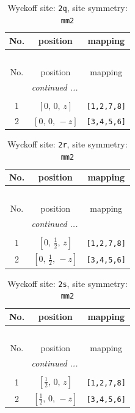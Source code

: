 \documentclass[fleqn,8pt]{jsarticle}
\begin{document}
\renewcommand{\arraystretch}{1.2}
\begin{longtable}{ccc}
\caption{Wyckoff site: {\tt 2q}, site symmetry: {\tt mm2}}
 \\
 \hline \hline
No. & position & mapping \\ \hline \endfirsthead

\multicolumn{2}{l}{\tablename\ \thetable{}} \\
 \hline \hline
No. & position & mapping \\ \hline \endhead

 \hline \hline
\multicolumn{2}{r}{\footnotesize\it continued ...} \\ \endfoot

 \hline \hline
\multicolumn{2}{r}{} \\ \endlastfoot

1 & $\left[ 0,\, 0,\, z \right]$ & {\tt [1,2,7,8]} \\ \hline
2 & $\left[ 0,\, 0,\, - z \right]$ & {\tt [3,4,5,6]} \\
\end{longtable}
\renewcommand{\arraystretch}{1.2}
\begin{longtable}{ccc}
\caption{Wyckoff site: {\tt 2r}, site symmetry: {\tt mm2}}
 \\
 \hline \hline
No. & position & mapping \\ \hline \endfirsthead

\multicolumn{2}{l}{\tablename\ \thetable{}} \\
 \hline \hline
No. & position & mapping \\ \hline \endhead

 \hline \hline
\multicolumn{2}{r}{\footnotesize\it continued ...} \\ \endfoot

 \hline \hline
\multicolumn{2}{r}{} \\ \endlastfoot

1 & $\left[ 0,\, \frac{1}{2},\, z \right]$ & {\tt [1,2,7,8]} \\ \hline
2 & $\left[ 0,\, \frac{1}{2},\, - z \right]$ & {\tt [3,4,5,6]} \\
\end{longtable}
\renewcommand{\arraystretch}{1.2}
\begin{longtable}{ccc}
\caption{Wyckoff site: {\tt 2s}, site symmetry: {\tt mm2}}
 \\
 \hline \hline
No. & position & mapping \\ \hline \endfirsthead

\multicolumn{2}{l}{\tablename\ \thetable{}} \\
 \hline \hline
No. & position & mapping \\ \hline \endhead

 \hline \hline
\multicolumn{2}{r}{\footnotesize\it continued ...} \\ \endfoot

 \hline \hline
\multicolumn{2}{r}{} \\ \endlastfoot

1 & $\left[ \frac{1}{2},\, 0,\, z \right]$ & {\tt [1,2,7,8]} \\ \hline
2 & $\left[ \frac{1}{2},\, 0,\, - z \right]$ & {\tt [3,4,5,6]} \\
\end{longtable}
\end{document}
